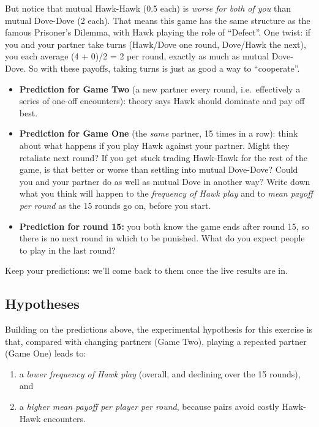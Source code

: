 \documentclass[
  a4paper]{book}
\providecommand{\tightlist}{%
  \setlength{\itemsep}{0pt}\setlength{\parskip}{0pt}}
\begin{document}
But notice that mutual Hawk-Hawk (0.5 each) is \emph{worse for both of you} than mutual Dove-Dove (2 each). That means this game has the same structure as the famous Prisoner's Dilemma, with Hawk playing the role of ``Defect''. One twist: if you and your partner take turns (Hawk/Dove one round, Dove/Hawk the next), you each average (4 + 0)/2 = 2 per round, exactly as much as mutual Dove-Dove. So with these payoffs, taking turns is just as good a way to ``cooperate''.

\begin{itemize}
\tightlist
\item
  \textbf{Prediction for Game Two} (a new partner every round, i.e.~effectively a series of one-off encounters): theory says Hawk should dominate and pay off best.
\item
  \textbf{Prediction for Game One} (the \emph{same} partner, 15 times in a row): think about what happens if you play Hawk against your partner. Might they retaliate next round? If you get stuck trading Hawk-Hawk for the rest of the game, is that better or worse than settling into mutual Dove-Dove? Could you and your partner do as well as mutual Dove in another way? Write down what you think will happen to the \emph{frequency of Hawk play} and to \emph{mean payoff per round} as the 15 rounds go on, before you start.
\item
  \textbf{Prediction for round 15:} you both know the game ends after round 15, so there is no next round in which to be punished. What do you expect people to play in the last round?
\end{itemize}

Keep your predictions: we'll come back to them once the live results are in.

\subsection{Hypotheses}\label{hypotheses}

Building on the predictions above, the experimental hypothesis for this exercise is that, compared with changing partners (Game Two), playing a repeated partner (Game One) leads to:

\begin{enumerate}
\def\labelenumi{\arabic{enumi}.}
\tightlist
\item
  a \emph{lower frequency of Hawk play} (overall, and declining over the 15 rounds), and
\item
  a \emph{higher mean payoff per player per round}, because pairs avoid costly Hawk-Hawk encounters.
\end{enumerate}
\end{document}
